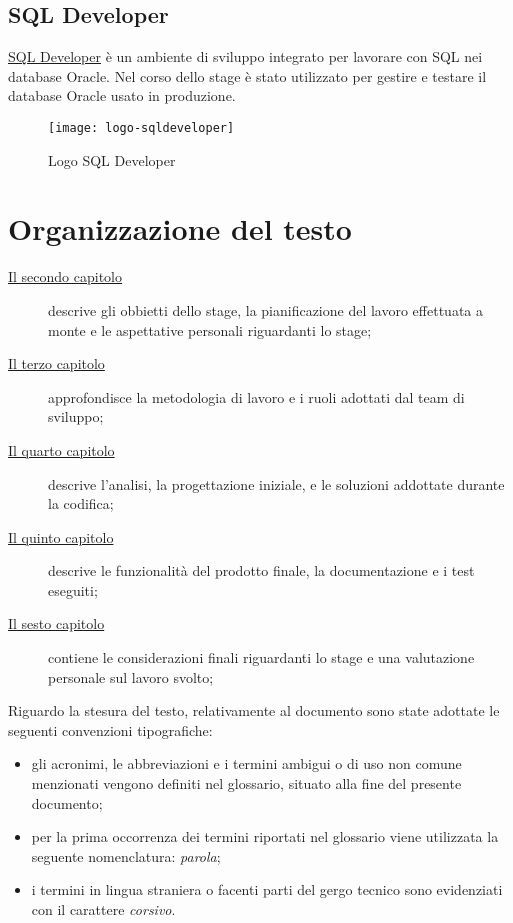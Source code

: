 \subsection{SQL Developer}
\href{https://www.oracle.com/database/technologies/appdev/sqldeveloper-landing.html}{SQL Developer} è un ambiente di sviluppo integrato per lavorare con SQL nei database Oracle. Nel corso dello stage è stato utilizzato per gestire e testare il database Oracle usato in produzione.
\begin{figure}[h]
    \begin{center}
    \texttt{[image: logo-sqldeveloper]}
    \caption{Logo SQL Developer}
    \label{fig:figure13}
    \end{center}
\end{figure}

\section{Organizzazione del testo}

\begin{description}
    \item[{\hyperref[cap:obbiettivi-pianificazione]{Il secondo capitolo}}] descrive gli obbietti dello stage, la pianificazione del lavoro effettuata a monte e le aspettative personali riguardanti lo stage;
    
    \item[{\hyperref[cap:metodologia-lavoro]{Il terzo capitolo}}] approfondisce la metodologia di lavoro e i ruoli adottati dal team di sviluppo;
    
    \item[{\hyperref[cap:analisi]{Il quarto capitolo}}] descrive l'analisi, la progettazione iniziale, e le soluzioni addottate durante la codifica;
    
    \item[{\hyperref[cap:prodotto]{Il quinto capitolo}}] descrive le funzionalità del prodotto finale, la documentazione e i test eseguiti;
    
    \item[{\hyperref[cap:considerazioni]{Il sesto capitolo}}] contiene le considerazioni finali riguardanti lo stage e una valutazione personale sul lavoro svolto;

\end{description}

Riguardo la stesura del testo, relativamente al documento sono state adottate le seguenti convenzioni tipografiche:
\begin{itemize}
	\item gli acronimi, le abbreviazioni e i termini ambigui o di uso non comune menzionati vengono definiti nel glossario, situato alla fine del presente documento;
	\item per la prima occorrenza dei termini riportati nel glossario viene utilizzata la seguente nomenclatura: \emph{parola}\glsfirstoccur{};
	\item i termini in lingua straniera o facenti parti del gergo tecnico sono evidenziati con il carattere \emph{corsivo}.
\end{itemize}